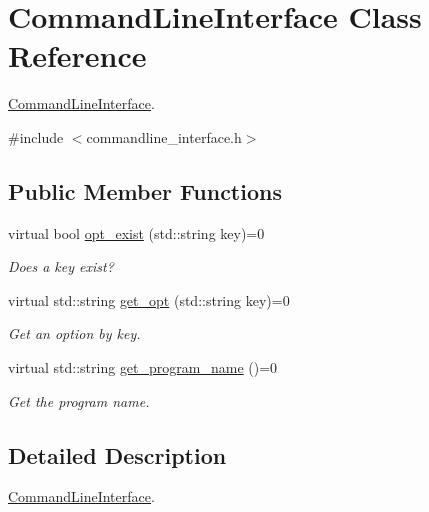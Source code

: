 \hypertarget{classCommandLineInterface}{\section{Command\-Line\-Interface Class Reference}
\label{classCommandLineInterface}
}


\hyperlink{classCommandLineInterface}{Command\-Line\-Interface}.  




{\ttfamily \#include $<$commandline\-\_\-interface.\-h$>$}

\subsection*{Public Member Functions}
\begin{DoxyCompactItemize}
\item 
\hypertarget{classCommandLineInterface_a4ee445b7c34f27b7fc9d265d88e5d82a}{virtual bool \hyperlink{classCommandLineInterface_a4ee445b7c34f27b7fc9d265d88e5d82a}{opt\-\_\-exist} (std\-::string key)=0}\label{classCommandLineInterface_a4ee445b7c34f27b7fc9d265d88e5d82a}

\begin{DoxyCompactList}\small\item\em Does a key exist? \end{DoxyCompactList}\item 
\hypertarget{classCommandLineInterface_a12399397b591b0eb779caad05947f800}{virtual std\-::string \hyperlink{classCommandLineInterface_a12399397b591b0eb779caad05947f800}{get\-\_\-opt} (std\-::string key)=0}\label{classCommandLineInterface_a12399397b591b0eb779caad05947f800}

\begin{DoxyCompactList}\small\item\em Get an option by key. \end{DoxyCompactList}\item 
virtual std\-::string \hyperlink{classCommandLineInterface_a47bd2a11bc8d8f507a7f75dbef36a3c9}{get\-\_\-program\-\_\-name} ()=0
\begin{DoxyCompactList}\small\item\em Get the program name. \end{DoxyCompactList}\end{DoxyCompactItemize}


\subsection{Detailed Description}
\hyperlink{classCommandLineInterface}{Command\-Line\-Interface}. 

